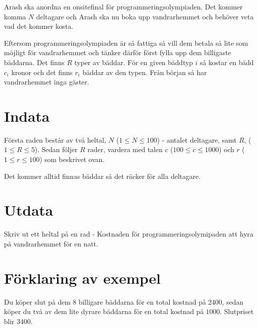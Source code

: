 
Arash ska anordna en onsitefinal för programmeringsolympiaden. Det kommer komma
$N$ deltagare och Arash ska nu boka upp vandrarhemmet och behöver veta vad det
kommer kosta.

Eftersom programmeringsolympiaden är så fattiga så vill dem betala så lite som
möjligt för vandrarhemmet och tänker därför först fylla upp dem billigaste
bäddarna. Det finns $R$ typer av bäddar. För en given bäddtyp $i$ så kostar en bädd
$c_i$ kronor och det finns $r_i$ bäddar av den typen. Från början så har
vandrarhemmet inga gäster.

\section*{Indata}

Första raden består av två heltal, $N$ ($1 \leq N \leq 100$) - antalet
deltagare, samt $R$, ($1 \leq R \leq 5$). Sedan följer $R$ rader, vardera med
talen $c$ ($100 \leq c \leq 1000$) och $r$ ($1 \leq r \leq 100$) som beskrivet ovan.

Det kommer alltid finnas bäddar så det räcker för alla deltagare.

\section*{Utdata}

Skriv ut ett heltal på en rad - Kostnaden för programmeringsolymipaden att hyra
på vandrarhemmet för en natt.

\section*{Förklaring av exempel}

Du köper slut på dem 8 billigare bäddarna för en total kostnad på $2400$, sedan
köper du två av dem lite dyrare bäddarna för en total kostnad på $1000$.
Slutpriset blir $3400$.
